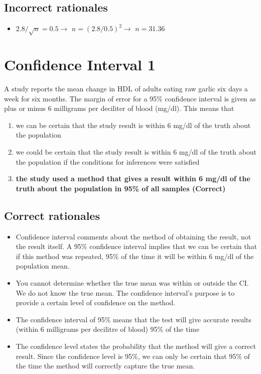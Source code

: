 \documentclass[letterpaper,9pt,twoside,printwatermark=false]{pinp}
\providecommand{\tightlist}{%
  \setlength{\itemsep}{0pt}\setlength{\parskip}{0pt}}
\begin{document}
\subsection{Incorrect rationales}\label{incorrect-rationales-1}

\begin{itemize}
\tightlist
\item
  \(2.8/\sqrt{n}=0.5 \to\) \(n=(2.8/0.5)^2 \to\) \(n=31.36\)
\end{itemize}

\section{Confidence Interval 1}\label{confidence-interval-1}

A study reports the mean change in HDL of adults eating raw garlic six
days a week for six months. The margin of error for a 95\% confidence
interval is given as plus or minus 6 milligrams per deciliter of blood
(mg/dl). This means that

\begin{enumerate}
\def\labelenumi{\alph{enumi}.}
\tightlist
\item
  we can be certain that the study result is within 6 mg/dl of the truth
  about the population
\item
  we could be certain that the study result is within 6 mg/dl of the
  truth about the population if the conditions for inferences were
  satisfied
\item
  \textbf{the study used a method that gives a result within 6 mg/dl of
  the truth about the population in 95\% of all samples (Correct)}
\end{enumerate}

\subsection{Correct rationales}\label{correct-rationales-2}

\begin{itemize}
\tightlist
\item
  Confidence interval comments about the method of obtaining the result,
  not the result itself. A 95\% confidence interval implies that we can
  be certain that if this method was repeated, 95\% of the time it will
  be within 6 mg/dl of the population mean.
\item
  You cannot determine whether the true mean was within or outside the
  CI. We do not know the true mean. The confidence interval's purpose is
  to provide a certain level of confidence on the method.
\item
  The confidence interval of 95\% means that the test will give accurate
  results (within 6 milligrams per decilitre of blood) 95\% of the time
\item
  The confidence level states the probability that the method will give
  a correct result. Since the confidence level is 95\%, we can only be
  certain that 95\% of the time the method will correctly capture the
  true mean.
\end{itemize}
\end{document}
